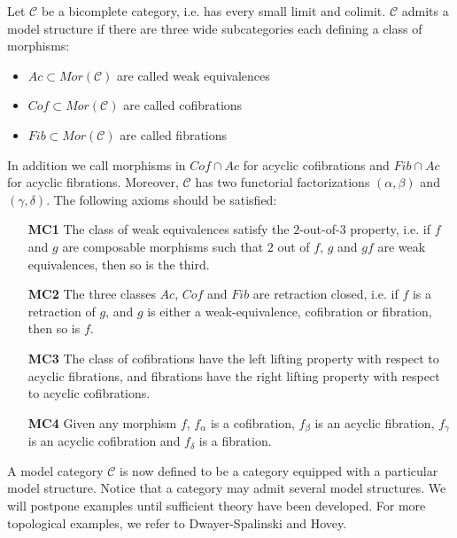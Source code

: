 \documentclass[../thesis.tex]{subfiles}
\begin{document}
            \begin{definition}
                Let $\mathcal{C}$ be a bicomplete category, i.e. has every small limit and colimit. $\mathcal{C}$ admits a model structure if there are three wide subcategories each defining a class of morphisms:
                \begin{itemize}
                    \item $Ac\subset Mor(\mathcal{C})$ are called weak equivalences
                    \item $Cof\subset Mor(\mathcal{C})$ are called cofibrations
                    \item $Fib\subset Mor(\mathcal{C})$ are called fibrations
                \end{itemize}
                In addition we call morphisms in $Cof\cap Ac$ for acyclic cofibrations and $Fib\cap Ac$ for acyclic fibrations. Moreover, $\mathcal{C}$ has two functorial factorizations $(\alpha, \beta)$ and $(\gamma, \delta)$. The following axioms should be satisfied:
                \begin{itemize}
                    \item[\textbf{MC1}] The class of weak equivalences satisfy the $2$-out-of-$3$ property, i.e. if $f$ and $g$ are composable morphisms such that $2$ out of $f$, $g$ and $gf$ are weak equivalences, then so is the third.
                    \item[\textbf{MC2}] The three classes $Ac$, $Cof$ and $Fib$ are retraction closed, i.e. if $f$ is a retraction of $g$, and $g$ is either a weak-equivalence, cofibration or fibration, then so is $f$.
                    \item[\textbf{MC3}] The class of cofibrations have the left lifting property with respect to acyclic fibrations, and fibrations have the right lifting property with respect to acyclic cofibrations.
                    \item[\textbf{MC4}] Given any morphism $f$, $f_\alpha$ is a cofibration, $f_\beta$ is an acyclic fibration, $f_\gamma$ is an acyclic cofibration and $f_\delta$ is a fibration.      
                \end{itemize}
            \end{definition}

            A model category $\mathcal{C}$ is now defined to be a category equipped with a particular model structure. Notice that a category may admit several model structures. We will postpone examples until sufficient theory have been developed. For more topological examples, we refer to Dwayer-Spalinski and Hovey.
\end{document}
